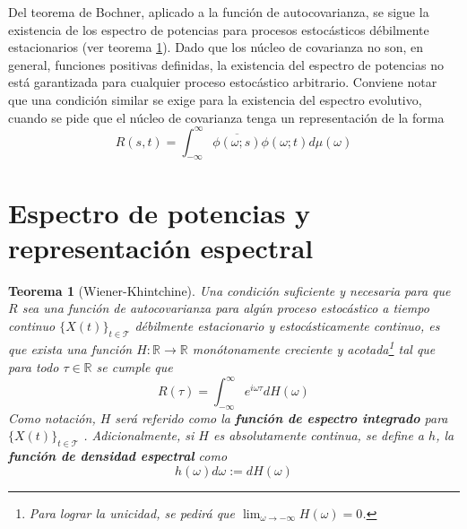 \documentclass[12pt,letterpaper]{book}
\newtheorem{teorema}{Teorema}[chapter]
\newcommand{\R}{\mathbb{R}}
\newcommand{\intR}{\int_{-\infty}^{\infty}}
\newcommand{\xt}{$\{X(t)\}_{t\in \mathcal{T}}$ }
\begin{document}
Del teorema de Bochner, aplicado a la función de autocovarianza, se sigue la existencia de los espectro de potencias para procesos estocásticos débilmente estacionarios (ver teorema \ref{t_wienerkhinchin}).
%
Dado que los núcleo de covarianza no son, en general, funciones positivas definidas, la existencia del espectro de potencias no está garantizada para cualquier proceso estocástico arbitrario.
%
Conviene notar que una condición similar se exige para la existencia del espectro evolutivo, cuando se pide que el núcleo de covarianza tenga un representación de la forma
\begin{equation}
R(s,t) = \intR \overline{\phi(\omega;s)}\phi(\omega;t) d\mu(\omega)
\end{equation}



\section{Espectro de potencias y representación espectral}
\label{sec:fde}


\begin{teorema}[Wiener-Khintchine]
\label{t_wienerkhinchin}
Una condición suficiente y necesaria para que $R$ sea una función de autocovarianza para algún proceso estocástico a tiempo continuo \xt débilmente estacionario y estocásticamente continuo, es que exista una función $H: \R\rightarrow\R$ monótonamente creciente y acotada\footnote{Para lograr la unicidad, se pedirá que $\lim_{\omega\rightarrow -\infty} H(\omega) = 0$.} tal que para todo $\tau \in \R$ se cumple que
\begin{equation*}
R(\tau) = \intR e^{i \omega \tau} dH(\omega)
\end{equation*}
Como notación, $H$ será referido como la \textbf{función de espectro integrado} para \xt.
%
Adicionalmente, si $H$ es absolutamente continua, se define a $h$, la \textbf{función de densidad espectral} como
\begin{equation}
h(\omega) d\omega := dH(\omega)
\end{equation}
\end{teorema}
\end{document}
